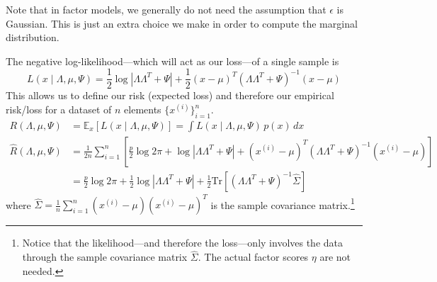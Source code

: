   Note that in factor models, we generally do not need the assumption that $\epsilon$ is Gaussian. This is just an extra choice we make in order to compute the marginal distribution. 

  \begin{theorem}
    The negative log-likelihood---which will act as our loss---of a single sample is 
    \begin{equation}
      L(x \mid \Lambda, \mu, \Psi) = \frac{1}{2} \log|\Lambda \Lambda^T + \Psi| + \frac{1}{2} (x - \mu)^T (\Lambda \Lambda^T + \Psi)^{-1} (x - \mu)
    \end{equation} 
    This allows us to define our risk (expected loss) and therefore our empirical risk/loss for a dataset of $n$ elements $\{x^{(i)}\}_{i=1}^n$. 
    \begin{align}
      R(\Lambda, \mu, \Psi) & = \mathbb{E}_x [ L(x \mid \Lambda, \mu, \Psi)] = \int L(x \mid \Lambda, \mu, \Psi) \, p(x) \,dx \\
      \hat{R}(\Lambda, \mu, \Psi) & = \frac{1}{2n} \sum_{i=1}^n \left[ \frac{p}{2} \log{2 \pi} + \log|\Lambda \Lambda^T + \Psi| + (x^{(i)} - \mu)^T (\Lambda \Lambda^T + \Psi)^{-1} (x^{(i)} - \mu) \right] \\ 
                                  & = \frac{p}{2} \log{2 \pi} + \frac{1}{2} \log|\Lambda \Lambda^T + \Psi| + \frac{1}{2} \text{Tr}\left[(\Lambda \Lambda^T + \Psi)^{-1} \hat{\Sigma}\right]
    \end{align}
    where $\hat{\Sigma} = \frac{1}{n}\sum_{i=1}^n (x^{(i)} - \mu)(x^{(i)} - \mu)^T$ is the sample covariance matrix.\footnote{Notice that the likelihood---and therefore the loss---only involves the data through the sample covariance matrix $\hat{\Sigma}$. The actual factor scores $\eta$ are not needed.}
  \end{theorem}

